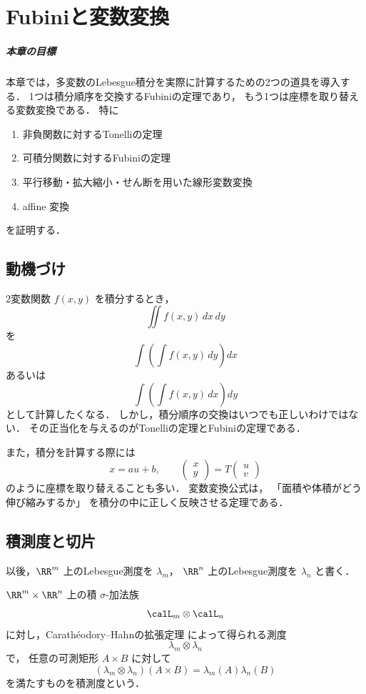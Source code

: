 \setcounter{chapter}{10}
\chapter{Fubiniと変数変換}

\paragraph{本章の目標}
本章では，多変数のLebesgue積分を実際に計算するための2つの道具を導入する．
1つは積分順序を交換するFubiniの定理であり，
もう1つは座標を取り替える変数変換である．
特に
\begin{enumerate}
    \item 非負関数に対するTonelliの定理
    \item 可積分関数に対するFubiniの定理
    \item 平行移動・拡大縮小・せん断を用いた線形変数変換
    \item affine 変換
\end{enumerate}
を証明する．

\section{動機づけ}

2変数関数 $f(x,y)$ を積分するとき，
\[
\iint f(x,y)\,dx\,dy
\]
を
\[
\int\left(\int f(x,y)\,dy\right)dx
\]
あるいは
\[
\int\left(\int f(x,y)\,dx\right)dy
\]
として計算したくなる．
しかし，積分順序の交換はいつでも正しいわけではない．
その正当化を与えるのがTonelliの定理とFubiniの定理である．

また，積分を計算する際には
\[
x=au+b,\qquad
\begin{pmatrix}x\\ y\end{pmatrix}
=
T\begin{pmatrix}u\\ v\end{pmatrix}
\]
のように座標を取り替えることも多い．
変数変換公式は，
「面積や体積がどう伸び縮みするか」
を積分の中に正しく反映させる定理である．

\section{積測度と切片}

以後，$\RR^m$ 上のLebesgue測度を $\lambda_m$，
$\RR^n$ 上のLebesgue測度を $\lambda_n$ と書く．

\begin{definition}[積測度]\label{def:product-measure}
$\RR^m\times\RR^n$ 上の積 $\sigma$-加法族
\[
\calL_m\otimes \calL_n
\]
に対し，Carathéodory--Hahnの拡張定理
によって得られる測度
\[
\lambda_m\otimes\lambda_n
\]
で，
任意の可測矩形 $A\times B$ に対して
\[
(\lambda_m\otimes\lambda_n)(A\times B)=\lambda_m(A)\lambda_n(B)
\]
を満たすものを積測度という．
\end{definition}

